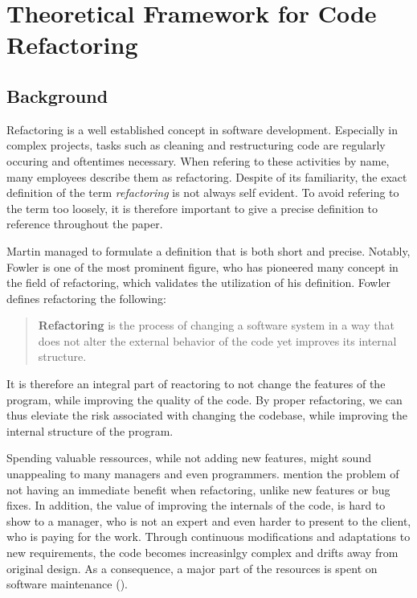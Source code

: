 \chapter{Theoretical Framework for Code Refactoring}

\section{Background}



Refactoring is a well established concept in software development. 
Especially in complex projects, 
	tasks such as cleaning and restructuring code are regularly occuring and oftentimes necessary. 
When refering to these activities by name, many employees describe them as refactoring. 
Despite of its familiarity, 
	the exact definition of the term \emph{refactoring} is not always self evident.
To avoid refering to the term too loosely, 
	it is therefore important to give a precise definition to reference throughout the paper. 

Martin \textcite[p. ~xiv]{fowler2018} managed to formulate a definition that is both short and precise. 
Notably, Fowler is one of the most prominent figure, 
	who has pioneered many concept in the field of refactoring,
	which validates the utilization of his definition.
Fowler defines refactoring the following:
\begin{quote}
\textbf{Refactoring} is the process of changing a software system in a way 
	that does not alter the external behavior of the code yet improves its internal structure.
\end{quote}

It is therefore an integral part of reactoring to not change the features of the program, 
	while improving the quality of the code.
By proper refactoring, we can thus eleviate the risk associated with changing the codebase,
	while improving the internal structure of the program.



Spending valuable ressources, while not adding new features, 
	might sound unappealing to many managers and even programmers.
\textcite[p.~1]{kim2012} mention the problem of not having an immediate benefit when refactoring, 
	unlike new features or bug fixes.
In addition, the value of improving the internals of the code, is hard to show to a manager, 
	who is not an expert and even harder to present to the client, who is paying for the work.
Through continuous modifications and adaptations to new requirements, the code becomes increasinlgy complex and drifts away from original design. 
As a consequence, 
	a major part of the resources is spent on software maintenance (\cite[p.~1]{mens2003}). 

